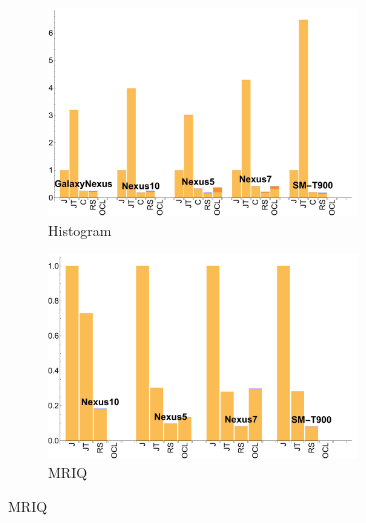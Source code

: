 \begin{figure}[ht]
  \begin{subfigure}[b]{0.5\textwidth}
      \centering
      \includegraphics[width=0.9\textwidth]{data/Histogram_time.pdf}
      \caption{Histogram}\label{fig:histo}
  \end{subfigure}
  \begin{subfigure}[b]{0.5\textwidth}
      \centering
      \includegraphics[width=0.9\textwidth]{data/Mriq_time.pdf}
      \caption{MRIQ}
      \label{fig:MRIQ}
  \end{subfigure}


\end{figure}
